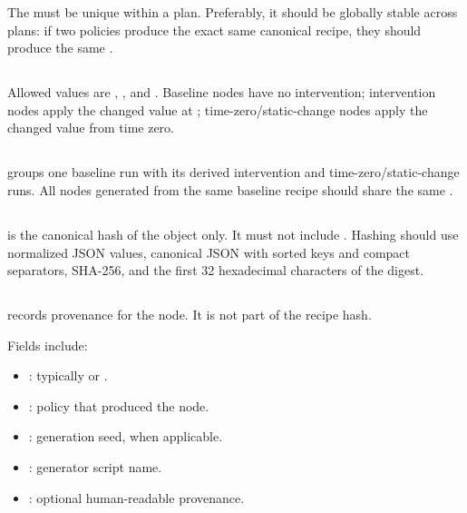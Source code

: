 \documentclass[11pt]{article}
\begin{document}
The  must be unique within a plan.
Preferably, it should be globally stable across plans: if two policies produce the exact same canonical recipe, they should produce the same .

\subsection*{\texorpdfstring{}{kind}}

Allowed values are , , and .
Baseline nodes have no intervention; intervention nodes apply the changed value at ; time-zero/static-change nodes apply the changed value from time zero.

\subsection*{\texorpdfstring{}{family\_id}}

 groups one baseline run with its derived intervention and time-zero/static-change runs.
All nodes generated from the same baseline recipe should share the same .

\subsection*{\texorpdfstring{}{recipe\_hash}}

 is the canonical hash of the  object only.
It must not include .
Hashing should use normalized JSON values, canonical JSON with sorted keys and compact separators, SHA-256, and the first 32 hexadecimal characters of the digest.

\subsection*{\texorpdfstring{}{metadata}}

 records provenance for the node.
It is not part of the recipe hash.

Fields include:

\begin{itemize}
\item {}: typically  or .
\item {}: policy that produced the node.
\item {}: generation seed, when applicable.
\item {}: generator script name.
\item {}: optional human-readable provenance.
\end{itemize}
\end{document}
